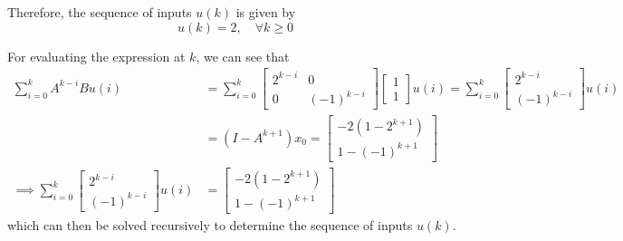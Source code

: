 Therefore, the sequence of inputs \( u(k) \) is given by
\[
    \boxed{
        u(k) = 2, \quad \forall k \geq 0
    }
\]

For evaluating the expression at \( k \), we can see that
\begin{align*}
    \sum_{i=0}^{k} A^{k - i} B u(i)
     & =
    \sum_{i=0}^{k}
    \left[\begin{array}{cc}
                  2^{k - i} & 0            \\
                  0         & (-1)^{k - i}
              \end{array}\right]
    \left[\begin{array}{c}
                  1 \\
                  1
              \end{array}\right]
    u(i)
    =
    \sum_{i=0}^{k}
    \left[\begin{array}{c}
                  2^{k - i} \\
                  (-1)^{k - i}
              \end{array}\right]
    u(i)
    \\ & =
    (I - A^{k + 1}) x_0
    =
    \left[\begin{array}{c}
                  -2(1 - 2^{k + 1}) \\
                  1 - (-1)^{k + 1}
              \end{array}\right]
    \\
    \implies
    \sum_{i=0}^{k}
    \left[\begin{array}{c}
                  2^{k - i} \\
                  (-1)^{k - i}
              \end{array}\right]
    u(i)
     & =
    \left[\begin{array}{c}
                  -2(1 - 2^{k + 1}) \\
                  1 - (-1)^{k + 1}
              \end{array}\right]
\end{align*}
which can then be solved recursively to determine the sequence of inputs \( u(k) \).
